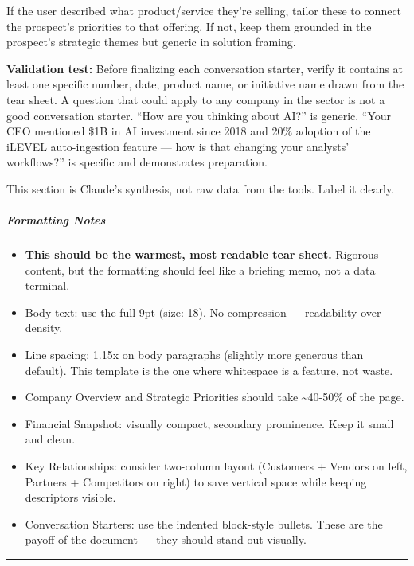 \documentclass[11pt]{article}
\begin{document}
If the user described what product/service they're selling, tailor these to connect the prospect's priorities to that offering. If not, keep them grounded in the prospect's strategic themes but generic in solution framing.


\textbf{Validation test:} Before finalizing each conversation starter, verify it contains at least one specific number, date, product name, or initiative name drawn from the tear sheet. A question that could apply to any company in the sector is not a good conversation starter. ``How are you thinking about AI?'' is generic. ``Your CEO mentioned \$1B in AI investment since 2018 and 20\% adoption of the iLEVEL auto-ingestion feature — how is that changing your analysts' workflows?'' is specific and demonstrates preparation.


This section is Claude's synthesis, not raw data from the tools. Label it clearly.


\subparagraph{Formatting Notes}\mbox{}\par
\begin{itemize}[leftmargin=*,itemsep=2pt,topsep=2pt]
\item {} \textbf{This should be the warmest, most readable tear sheet.} Rigorous content, but the formatting should feel like a briefing memo, not a data terminal.
\item {} Body text: use the full 9pt (size: 18). No compression — readability over density.
\item {} Line spacing: 1.15x on body paragraphs (slightly more generous than default). This template is the one where whitespace is a feature, not waste.
\item {} Company Overview and Strategic Priorities should take \textasciitilde{}40-50\% of the page.
\item {} Financial Snapshot: visually compact, secondary prominence. Keep it small and clean.
\item {} Key Relationships: consider two-column layout (Customers + Vendors on left, Partners + Competitors on right) to save vertical space while keeping descriptors visible.
\item {} Conversation Starters: use the indented block-style bullets. These are the payoff of the document — they should stand out visually.
\end{itemize}

\vspace{0.8em}\hrule\vspace{0.8em}
\end{document}
